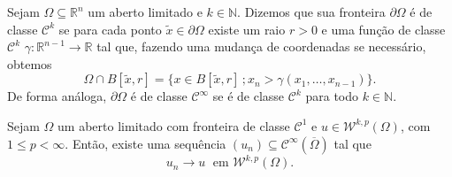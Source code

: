 \documentclass[a4paper, 11pt]{book}
\theoremstyle{definition}
\newcommand{\bN}{\mathbb{N}}
\newcommand{\bR}{\mathbb{R}}
\newcommand{\cC}{\mathcal{C}}
\newcommand{\cW}{\mathcal{W}}
\begin{document}
\begin{dbox} \label{def:fronteira-ck}
    Sejam $\Omega \subseteq \bR^n$ um aberto limitado e $k \in \bN$. 
    Dizemos que sua fronteira $\partial \Omega$ é de classe $\cC^k$ se para cada ponto $\tilde x \in \partial \Omega$ existe um raio $r > 0$ e uma função de classe $\cC^k$ $\gamma : \bR^{n-1} \to \bR$ tal que, fazendo uma mudança de coordenadas se necessário, obtemos
    \[
        \Omega \cap B[\tilde x,r] = \{x \in B[\tilde x,r] \,; x_n > \gamma(x_1,\dots,x_{n-1})\}.
    \]
    De forma análoga, $\partial\Omega$ é de classe $\cC^\infty$ se é de classe $\cC^k$ para todo $k \in \bN$.
\end{dbox}

\begin{tbox} \label{thm:aprox3}
    Sejam $\Omega$ um aberto limitado com fronteira de classe $\cC^1$ e $u \in \cW^{k,p}(\Omega)$, com $1 \leqslant p < \infty$.
    Então, existe uma sequência $(u_n) \subseteq \cC^\infty(\overline\Omega)$ tal que
    \[
        u_n \to u \;\text{ em } \cW^{k,p}(\Omega).
    \]
\end{tbox}
\end{document}
